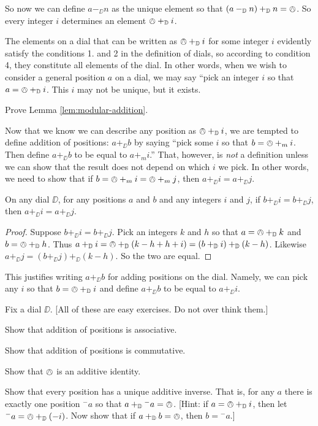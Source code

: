 So now we can define $a -_\DD n$ as the unique element so that $(a -_{\mathbb D} n) +_{\mathbb D} n = \owedge$. So every integer $i$ determines an element $\owedge +_{\mathbb D} i$. 

The elements on a dial that can be written as $\owedge +_{\mathbb D} i$ for some integer $i$ evidently satisfy the conditions 1. and 2 in the definition of dials, so according to condition 4, they constitute all elements of the dial.   
In other words, when we wish to consider a general position $a$ on a dial, we may say ``pick an integer $i$ so that $a = \owedge +_{\mathbb D} i$. This $i$ may not be unique, but it exists.

\begin{exer}
	\begin{exercise}
		\item Prove Lemma \ref{lem:modular-addition}.
	\end{exercise}
\end{exer}

Now that we know we can describe any position as $\owedge +_{\mathbb D} i$, we are tempted to define addition of positions: $a +_\DD b$ by saying ``pick some $i$ so that $b = \owedge +_m i$. Then define $a+_\DD b$ to be equal to $a +_m i$.'' That, however, is \emph{not} a definition unless we can show that the result does not depend on which $i$ we pick. In other words, we need to show that if $b=\owedge +_m i = \owedge +_m j$, then $a +_\DD i = a +_\DD j$.

\begin{lem}
	On any dial $\DD$, for any positions $a$ and $b$ and any integers $i$ and $j$, if $b +_\DD i = b +_\DD j$, then $a +_\DD i = a +_\DD j$.
	\begin{proof} 
Suppose $b +_\DD i = b +_\DD j$.
Pick an integers $k$ and $h$ so that $a = \owedge +_{\mathbb D} k$ and $b = \owedge +_{\mathbb D} h$. Thus $a+_{\mathbb D} i = \owedge +_{\mathbb D}(k-h+h + i) = (b +_{\mathbb D} i) +_{\mathbb D} (k-h)$. Likewise $a+_\DD j = (b +_\DD j) +_\DD(k-h)$. So the two are equal.
\end{proof}
\end{lem}

This justifies writing $a +_\DD b$ for adding positions on the dial. Namely, we can pick any $i$ so that $b = \owedge +_{\mathbb D} i$ and define $a +_\DD b$ to be equal to $a +_\DD i$. 

\begin{exer}
	Fix a dial $\DD$. [All of these are easy exercises. Do not over think them.]
	\begin{exercise}
		\item Show that addition of positions is associative.
		\item Show that addition of positions is commutative.
		\item Show that $\owedge$ is an additive identity.
		\item Show that every position has a unique additive inverse. That is, for any $a$ there is exactly one position ${}^-a$ so that $a +_{\mathbb D} {}^-a = \owedge$. [Hint: if $a = \owedge +_{\mathbb D} i$, then let ${}^-a = \owedge +_{\mathbb D}(-i)$. Now show that if $a +_{\mathbb D} b = \owedge$, then $b = {}^-a$.]
	\end{exercise}
\end{exer}

